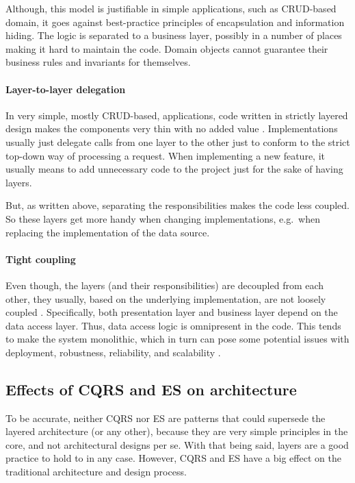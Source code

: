 \documentclass{book}
\begin{document}
Although, this model is justifiable in simple applications, such as
CRUD-based domain, it goes against best-practice principles of
encapsulation and information hiding. The logic is separated to a
business layer, possibly in a number of places making it hard to
maintain the code. Domain objects cannot guarantee their business rules
and invariants for themselves.

\paragraph{Layer-to-layer delegation}\label{layer-to-layer-delegation}

In very simple, mostly CRUD-based, applications, code written in
strictly layered design makes the components very thin with no added
value \cite{oreilly}. Implementations usually just delegate calls from
one layer to the other just to conform to the strict top-down way of
processing a request. When implementing a new feature, it usually means
to add unnecessary code to the project just for the sake of having
layers.

But, as written above, separating the responsibilities makes the code
less coupled. So these layers get more handy when changing
implementations, e.g.~when replacing the implementation of the data
source.

\paragraph{Tight coupling}\label{tight-coupling}

Even though, the layers (and their responsibilities) are decoupled from
each other, they usually, based on the underlying implementation, are
not loosely coupled \cite{oreilly}. Specifically, both presentation
layer and business layer depend on the data access layer. Thus, data
access logic is omnipresent in the code. This tends to make the system
monolithic, which in turn can pose some potential issues with
deployment, robustness, reliability, and scalability \cite{oreilly}.


\subsection{Effects of CQRS and ES on
architecture}\label{effects-of-cqrs-and-es-on-architecture}

To be accurate, neither CQRS nor ES are patterns that could supersede
the layered architecture (or any other), because they are very simple
principles in the core, and not architectural designs per se. With that
being said, layers are a good practice to hold to in any case. However,
CQRS and ES have a big effect on the traditional architecture and design
process.
\end{document}
